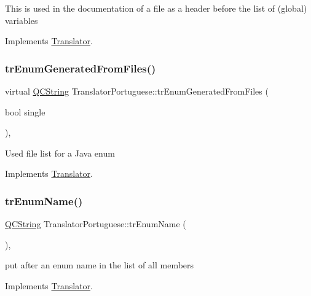 This is used in the documentation of a file as a header before the list of (global) variables 

Implements \mbox{\hyperlink{class_translator}{Translator}}.

\mbox{\label{class_translator_portuguese_a8cfc21d957e46ece1bcceb4fc30a8755}} 
\subsubsection{\texorpdfstring{trEnumGeneratedFromFiles()}{trEnumGeneratedFromFiles()}}
{\footnotesize\ttfamily virtual \mbox{\hyperlink{class_q_c_string}{Q\+C\+String}} Translator\+Portuguese\+::tr\+Enum\+Generated\+From\+Files (\begin{DoxyParamCaption}\item[{bool}]{single }\end{DoxyParamCaption})\hspace{0.3cm}{\ttfamily [inline]}, {\ttfamily [virtual]}}

Used file list for a Java enum 

Implements \mbox{\hyperlink{class_translator}{Translator}}.

\mbox{\label{class_translator_portuguese_aa721544b038b09d360ab1819aab791b5}} 
\subsubsection{\texorpdfstring{trEnumName()}{trEnumName()}}
{\footnotesize\ttfamily \mbox{\hyperlink{class_q_c_string}{Q\+C\+String}} Translator\+Portuguese\+::tr\+Enum\+Name (\begin{DoxyParamCaption}{ }\end{DoxyParamCaption})\hspace{0.3cm}{\ttfamily [inline]}, {\ttfamily [virtual]}}

put after an enum name in the list of all members 

Implements \mbox{\hyperlink{class_translator}{Translator}}.

\mbox{\label{class_translator_portuguese_a0dff38bef9093dc8ead3ea5f26027514}} 
